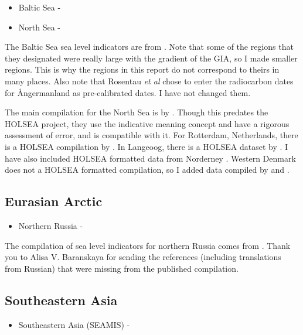 \label{sec:Europe}

\begin{itemize}
  \item Baltic Sea - \citet{RosentauEtal2021}
  \item North Sea - \citet{VinkEtal2007}
\end{itemize}

The Baltic Sea sea level indicators are from \citep{RosentauEtal2021}. Note that some of the regions that they designated were really large with the gradient of the GIA, so I made smaller regions. This is why the regions in this report do not correspond to theirs in many places. Also note that Rosentau \emph{et al} chose to enter the radiocarbon dates for {\AA}ngermanland as pre-calibrated dates. I have not changed them.


The main compilation for the North Sea is by \citet{VinkEtal2007}. Though this predates the HOLSEA project, they use the indicative meaning concept and have a rigorous assessment of error, and is compatible with it. For Rotterdam, Netherlands, there is a HOLSEA compilation by \citet{HijmaCohen2019}. In Langeoog, there is a HOLSEA dataset by \citet{BungenstockEtal2021}. I have also included HOLSEA formatted data from Norderney \citep{SchederEtal2022}. Western Denmark does not a HOLSEA formatted compilation, so I added data compiled by \citet{GehrelsEtal2006} and \citet{JessenEtal2019}.


\subsection{Eurasian Arctic}

\begin{itemize}
  \item Northern Russia - \citet{BaranskayaEtal2018}
\end{itemize}

The compilation of sea level indicators for northern Russia comes from \citet{BaranskayaEtal2018}. Thank you to Alisa V. Baranskaya for sending the references (including translations from Russian) that were missing from the published compilation.

\subsection{Southeastern Asia}

\begin{itemize}
  \item Southeastern Asia (SEAMIS) - \citet{MannEtal2019}
\end{itemize}

